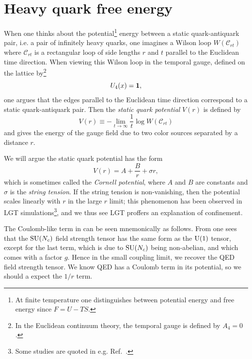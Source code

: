 \section{Heavy quark free energy}\label{sec:hqfe}


When one thinks about the potential\footnote{At finite temperature
one distinguishes between potential energy and free energy since $F=U-TS$.}
energy between a static quark-antiquark pair, 
i.e. a pair of infinitely heavy quarks, one imagines
a Wilson loop $W(\mathcal{C}_{rt})$
where $\mathcal{C}_{rt}$ is a rectangular loop of side lengths 
$r$ and $t$ parallel
to the Euclidean time direction. When
viewing this Wilson loop in the temporal gauge, 
defined on the lattice by\footnote{In the Euclidean continuum theory,
the temporal gauge is defined by $A_4=0$.}
\begin{equation}
  U_4(x)={\mathbf 1},
\end{equation}
one argues that
the edges parallel to the Euclidean time direction correspond to
a static quark-antiquark pair.
Then the {\it static quark potential}
 $V(r)$ is defined by
\begin{equation}\label{eq:staticpotential}
  V(r)\equiv-\lim_{t\to\infty}\frac{1}{t}\log W(\mathcal{C}_{rt})  
\end{equation}
and gives the energy of the gauge field due to two color sources separated by
a distance $r$. 


We will argue the static quark potential has the form
\begin{equation}\label{eq:cornellpotential}
  V(r)=A+\frac{B}{r}+\sigma r,
\end{equation}
which is sometimes called the {\it Cornell potential},
where $A$ and $B$ are constants and
$\sigma$ is the {\it string tension}. 
If the string tension is non-vanishing, then the potential scales linearly 
with $r$ in the large $r$ limit; 
this phenomenon has been observed in LGT 
simulations\footnote{Some studies are quoted in e.g.
Ref.~\cite{montvay_quantum_1994}.},
and we thus see LGT proffers an explanation of confinement.


The Coulomb-like term in  can be seen
mnemonically as follows. From 
one sees that the $\operatorname{SU}(N_c)$ field strength tensor has the same form
as the $\operatorname{U}(1)$ tensor, except for the last term, which is due to
$\operatorname{SU}(N_c)$ being non-abelian, and which comes with a factor $g$.
Hence in the small coupling limit, we recover the QED field
strength tensor. We know QED has a Coulomb term in its potential,
so we should a expect the $1/r$ term.


